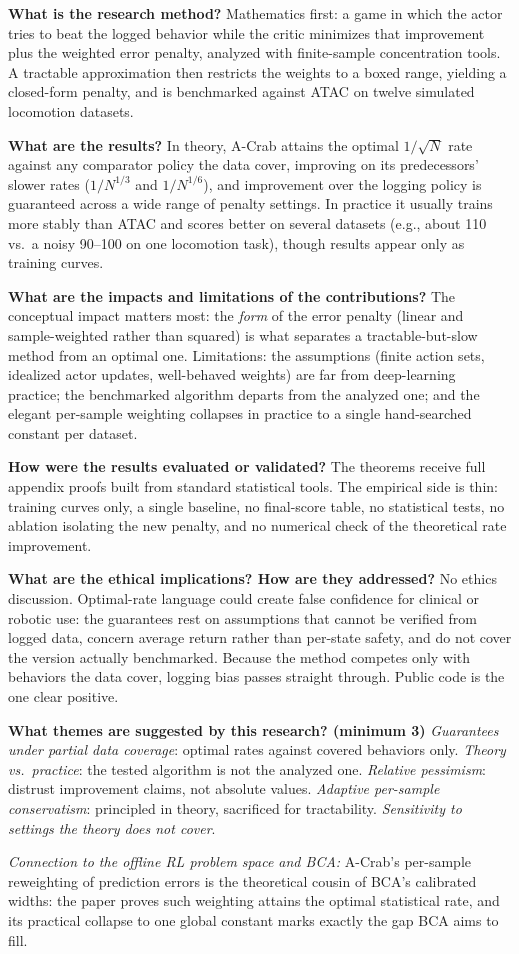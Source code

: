 \documentclass[11pt]{article}
\newcommand{\q}[2]{\item \textbf{#1} #2}
\newcommand{\tiein}[1]{\par\smallskip\noindent\emph{Connection to the offline RL problem space and BCA:} #1\par\medskip}
\begin{document}
\begin{qna}
\q{What is the research method?}
Mathematics first: a game in which the actor tries to beat the logged behavior while the critic minimizes that improvement plus the weighted error penalty, analyzed with finite-sample concentration tools. A tractable approximation then restricts the weights to a boxed range, yielding a closed-form penalty, and is benchmarked against ATAC on twelve simulated locomotion datasets.

\q{What are the results?}
In theory, A-Crab attains the optimal $1/\sqrt{N}$ rate against any comparator policy the data cover, improving on its predecessors' slower rates ($1/N^{1/3}$ and $1/N^{1/6}$), and improvement over the logging policy is guaranteed across a wide range of penalty settings. In practice it usually trains more stably than ATAC and scores better on several datasets (e.g., about 110 vs.\ a noisy 90--100 on one locomotion task), though results appear only as training curves.

\q{What are the impacts and limitations of the contributions?}
The conceptual impact matters most: the \emph{form} of the error penalty (linear and sample-weighted rather than squared) is what separates a tractable-but-slow method from an optimal one. Limitations: the assumptions (finite action sets, idealized actor updates, well-behaved weights) are far from deep-learning practice; the benchmarked algorithm departs from the analyzed one; and the elegant per-sample weighting collapses in practice to a single hand-searched constant per dataset.

\q{How were the results evaluated or validated?}
The theorems receive full appendix proofs built from standard statistical tools. The empirical side is thin: training curves only, a single baseline, no final-score table, no statistical tests, no ablation isolating the new penalty, and no numerical check of the theoretical rate improvement.

\q{What are the ethical implications? How are they addressed?}
No ethics discussion. Optimal-rate language could create false confidence for clinical or robotic use: the guarantees rest on assumptions that cannot be verified from logged data, concern average return rather than per-state safety, and do not cover the version actually benchmarked. Because the method competes only with behaviors the data cover, logging bias passes straight through. Public code is the one clear positive.

\q{What themes are suggested by this research? (minimum 3)}
\emph{Guarantees under partial data coverage}: optimal rates against covered behaviors only. \emph{Theory vs.\ practice}: the tested algorithm is not the analyzed one. \emph{Relative pessimism}: distrust improvement claims, not absolute values. \emph{Adaptive per-sample conservatism}: principled in theory, sacrificed for tractability. \emph{Sensitivity to settings the theory does not cover}.

\end{qna}
\tiein{A-Crab's per-sample reweighting of prediction errors is the theoretical cousin of BCA's calibrated widths: the paper proves such weighting attains the optimal statistical rate, and its practical collapse to one global constant marks exactly the gap BCA aims to fill.}
\end{document}
